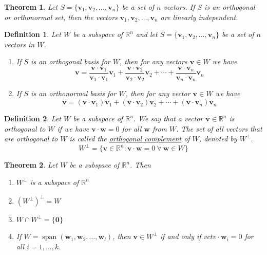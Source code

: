 \documentclass{article}
\theoremstyle{definitionstyle}
\newtheorem{definition}{Definition}[section]
\newtheorem{theorem}{Theorem}[section]
\newcommand{\vct}{\mathbf}
\begin{document}
\begin{theorem}
    Let $S=\{\vct{v}_1,\vct{v}_2,\dots,\vct{v}_n\}$ be a set of $n$ vectors.
    If $S$ is an orthogonal or orthonormal set, then the vectors $\vct{v}_1,\vct{v}_2,\dots,\vct{v}_n$
    are linearly independent.
\end{theorem}

\begin{definition}
    Let $W$ be a subspace of $\mathbb{R}^n$ and let $S=\{\vct{v}_1,\vct{v}_2,\dots,\vct{v}_n\}$ be a set of $n$ vectors
    in $W$.
    \begin{enumerate}
        \item If $S$ is an \textit{orthogonal basis} for $W$, then for any vectors $\vct{v} \in W$ we have
        \begin{equation*}
            \vct{v} = \frac{\vct v \cdot \vct{v}_1}{\vct{v}_1 \cdot \vct{v}_1}\vct{v}_1+\frac{\vct v \cdot \vct{v}_2}{\vct{v}_2 \cdot \vct{v}_2}\vct{v}_2+\cdots+\frac{\vct v \cdot \vct{v}_n}{\vct{v}_n \cdot \vct{v}_n}\vct{v}_n
        \end{equation*}
        \item If $S$ is an \textit{orthonormal basis} for $W$, then for any vector $\vct{v} \in W$ we have
        \begin{equation*}
            \vct{v} = {(\vct v \cdot \vct{v}_1)}\vct{v}_1+{(\vct v \cdot \vct{v}_2)}\vct{v}_2+\cdots+{(\vct v \cdot \vct{v}_n)}\vct{v}_n
        \end{equation*}
    \end{enumerate}
\end{definition}

\begin{definition}
    Let $W$ be a subspace of $\mathbb{R}^n$. We say that a vector
    $\vct v \in \mathbb{R}^n$ is \textit{orthogonal} to $W$ if we have $\vct v \cdot \vct w = 0$ for all
    $\vct w$ from $W$. The set of all vectors that are orthogonal to $W$ is called the \underline{orthogonal complement}
    of $W$, denoted by $W^\perp$.
    \begin{equation*}
        W^\perp=\{\vct v \in \mathbb{R}^n : \vct v \cdot \vct w = 0 \: \forall \: \vct w \in W\}
    \end{equation*}
\end{definition}

\begin{theorem}
    Let $W$ be a subspace of $\mathbb{R}^n$. Then
    \begin{enumerate}
        \item $W^\perp$ is a subspace of $\mathbb{R}^n$
        \item ${(W^\perp)}^\perp=W$
        \item $W \cap W^\perp = \{\vct{0}\}$
        \item If $W=\operatorname*{span}(\vct{w}_1,\vct{w}_2,\dots,\vct{w}_l)$, then $\vct v \in W^\perp$ if and only if 
        $vct{v} \cdot \vct{w}_i = 0$ for all $i=1,\dots,k$.
    \end{enumerate}
\end{theorem}
\end{document}
